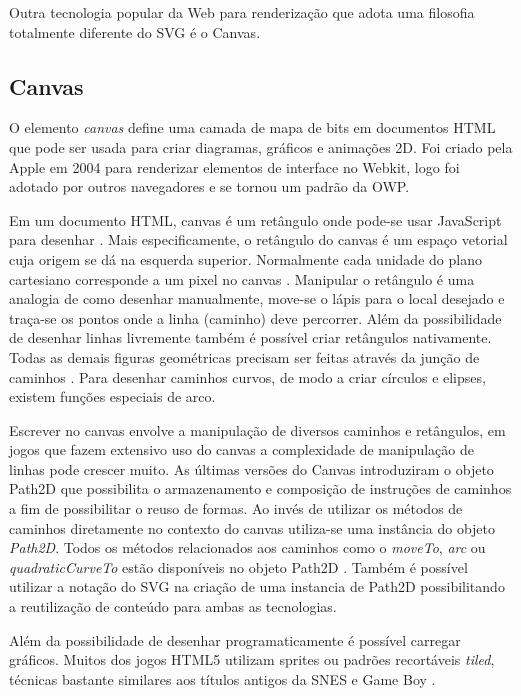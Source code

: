 Outra tecnologia popular da Web para renderização que adota uma filosofia totalmente 
diferente do SVG é o Canvas.
\subsection{Canvas}
O elemento \textit{canvas} define uma camada de mapa de bits em
documentos HTML que pode ser usada para criar diagramas, gráficos e
animações 2D. Foi criado pela Apple em 2004 para renderizar elementos
de interface no Webkit, logo foi adotado por outros navegadores e se
tornou um padrão da OWP.

Em um documento HTML, canvas é um retângulo onde pode-se usar
JavaScript para desenhar \autocite[p. 113]{diveIntohtml}. Mais
especificamente, o retângulo do canvas é um espaço vetorial cuja
origem se dá na esquerda superior. Normalmente cada unidade do plano
cartesiano corresponde a um pixel no canvas \autocite{mdnCanvas}.
Manipular o retângulo é uma analogia de como desenhar manualmente,
move-se o \textquotedbl lápis\textquotedbl{} para o local desejado e traça-se os pontos onde
a linha (caminho) deve percorrer. Além da possibilidade de desenhar
linhas livremente também é possível criar retângulos nativamente.
Todas as demais figuras geométricas precisam ser feitas através da
junção de caminhos \autocite{mdnCanvas}. Para desenhar caminhos
curvos, de modo a criar círculos e elipses, existem funções especiais
de arco.

Escrever no canvas envolve a manipulação de diversos caminhos e
retângulos, em jogos que fazem extensivo uso do canvas a complexidade
de manipulação de linhas pode crescer muito. As últimas versões do
Canvas introduziram o objeto Path2D que possibilita o armazenamento e
composição de instruções de caminhos a fim de possibilitar o reuso
de formas. Ao invés de utilizar os métodos de caminhos diretamente no
contexto do canvas utiliza-se uma instância do objeto \textit{Path2D}.
Todos os métodos relacionados aos caminhos como o \textit{moveTo},
\textit{arc} ou \textit{quadraticCurveTo} estão disponíveis no
objeto Path2D \autocite{mdnCanvas}. Também é possível utilizar a
notação do SVG na criação de uma instancia de Path2D possibilitando
a reutilização de conteúdo para ambas as tecnologias.

Além da possibilidade de desenhar programaticamente é possível
carregar gráficos. Muitos dos jogos HTML5 utilizam sprites ou padrões
recortáveis \textit{tiled}, técnicas bastante similares aos títulos antigos da
SNES e Game Boy \autocite{buildingHtml5Game}.

